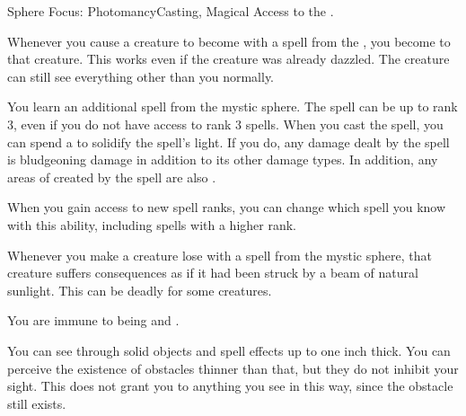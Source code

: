     \begin{magicalfeat}{Sphere Focus: Photomancy}{Casting, Magical}
        \featpre Access to the  .

         Whenever you cause a creature to become \dazzled with a spell from the  , you  become  to that creature.
        This works even if the creature was already dazzled.
        The creature can still see everything other than you normally.

         You learn an additional spell from the  mystic sphere.
        The spell can be up to rank 3, even if you do not have access to rank 3 spells.
        When you cast the spell, you can spend a  to solidify the spell's light.
        If you do, any damage dealt by the spell is bludgeoning damage in addition to its other damage types.
        In addition, any areas of  created by the spell are also .

        When you gain access to new spell ranks, you can change which spell you know with this ability, including spells with a higher rank.

         Whenever you make a creature lose  with a spell from the  mystic sphere, that creature suffers consequences as if it had been struck by a beam of natural sunlight.
        This can be deadly for some creatures.

         You are immune to being \dazzled and \blinded.

         You can see through solid objects and spell effects up to one inch thick.
        You can perceive the existence of obstacles thinner than that, but they do not inhibit your sight.
        This does not grant you  to anything you see in this way, since the obstacle still exists.
    \end{magicalfeat}

